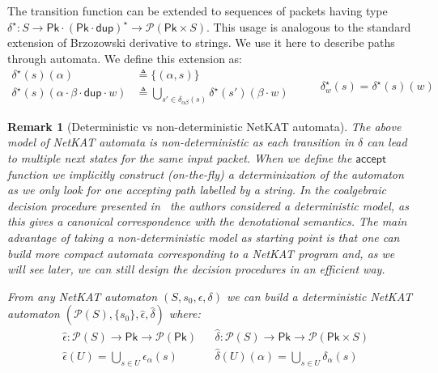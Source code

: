 \documentclass[acmsmall,dvipsnames,nonacm]{acmart}
\newtheorem{remark}{Remark}
\newcommand\Pk{\mathsf{Pk}}
\newcommand\pk{\alpha}
\newcommand\pkp{\beta}
\newcommand\dup{\mathsf{dup}}
\newcommand\ddd{\cdot\dup\cdot}
\newcommand\accept{\mathsf{accept}}
\newcommand\NetKAT{\textsf{NetKAT}\xspace}
\newcommand\pow[1]{\mathcal{P}(#1)}
\begin{document}
The transition function can be extended to sequences of packets having type
$\delta^\star\colon S \to \Pk\cdot(\Pk\cdot\dup)^\star\to\mathcal{P}(\Pk\times S)$. This usage
is analogous to the standard extension of Brzozowski derivative to strings. We use it here to describe
paths through automata. We define this extension as:
\begin{equation*}
  \begin{aligned}
    \delta^\star(s)(\pk) &\triangleq \{(\pk, s)\}\\
    \delta^\star (s) (\pk\cdot\pkp\ddd w) &\triangleq \bigcup_{s' \in \delta_{\pk\pkp}(s)} \delta^\star(s') (\pkp\cdot w)
\end{aligned}\qquad
\begin{array}{c}
\delta^\star_w (s) = \delta^\star(s)(w)
\end{array}
\end{equation*}

\begin{remark}[Deterministic vs non-deterministic \NetKAT automata]
The above model of \NetKAT automata is non-deterministic as each transition in $\delta$ can lead to multiple next states for the same input packet. When we define the $\accept$ function we implicitly construct (on-the-fly) a determinization of the automaton as we only look for one accepting path labelled by a string. In the coalgebraic decision procedure presented in~\cite{coalgebraic} the authors considered a deterministic model, as this gives a canonical correspondence with the denotational semantics. The main advantage of taking a  non-deterministic model as starting point is that one can build more compact automata corresponding to a NetKAT program and, as we will see later, we can still design the decision procedures in an efficient way. 

From any \NetKAT automaton  $(S, s_0, \epsilon, \delta)$ we can build a deterministic \NetKAT automaton  $(\pow S, \{s_0\}, \widehat\epsilon, \widehat\delta)$ where:
    \begin{align*}
&\widehat\epsilon \colon \pow S \to \Pk \to \pow\Pk &&\widehat \delta\colon \pow S \to \Pk \to\pow{\Pk \times S}\\
&\widehat\epsilon (U) = \bigcup\limits_{s\in U} \epsilon_\pk(s)&&\widehat\delta (U)(\pk) = \bigcup\limits_{s\in U} \delta_\pk(s)
\end{align*}
\end{remark}
\end{document}
